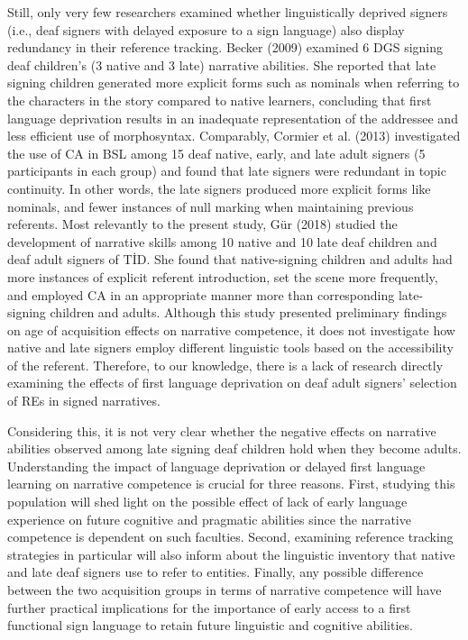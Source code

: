 \documentclass[]{elsarticle} %
\begin{document}
Still, only very few researchers examined whether linguistically
deprived signers (i.e., deaf signers with delayed exposure to a sign
language) also display redundancy in their reference tracking. Becker
(2009) examined 6 DGS signing deaf children's (3 native and 3 late)
narrative abilities. She reported that late signing children generated
more explicit forms such as nominals when referring to the characters in
the story compared to native learners, concluding that first language
deprivation results in an inadequate representation of the addressee and
less efficient use of morphosyntax. Comparably, Cormier et al. (2013)
investigated the use of CA in BSL among 15 deaf native, early, and late
adult signers (5 participants in each group) and found that late signers
were redundant in topic continuity. In other words, the late signers
produced more explicit forms like nominals, and fewer instances of null
marking when maintaining previous referents. Most relevantly to the
present study, Gür (2018) studied the development of narrative skills
among 10 native and 10 late deaf children and deaf adult signers of TİD.
She found that native-signing children and adults had more instances of
explicit referent introduction, set the scene more frequently, and
employed CA in an appropriate manner more than corresponding
late-signing children and adults. Although this study presented
preliminary findings on age of acquisition effects on narrative
competence, it does not investigate how native and late signers employ
different linguistic tools based on the accessibility of the referent.
Therefore, to our knowledge, there is a lack of research directly
examining the effects of first language deprivation on deaf adult
signers' selection of REs in signed narratives.

Considering this, it is not very clear whether the negative effects on
narrative abilities observed among late signing deaf children hold when
they become adults. Understanding the impact of language deprivation or
delayed first language learning on narrative competence is crucial for
three reasons. First, studying this population will shed light on the
possible effect of lack of early language experience on future cognitive
and pragmatic abilities since the narrative competence is dependent on
such faculties. Second, examining reference tracking strategies in
particular will also inform about the linguistic inventory that native
and late deaf signers use to refer to entities. Finally, any possible
difference between the two acquisition groups in terms of narrative
competence will have further practical implications for the importance
of early access to a first functional sign language to retain future
linguistic and cognitive abilities.
\end{document}

